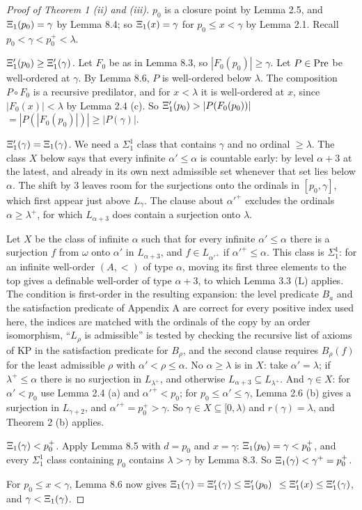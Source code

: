 \documentclass[11pt]{article}
\begin{document}
\begin{proof}[Proof of Theorem 1 (ii) and (iii)] $p_0$ is a closure point by Lemma 2.5, and $\Xi_1(p_0) = \gamma$
by Lemma 8.4; so $\Xi_1(x) = \gamma$ for $p_0 \le x < \gamma$ by Lemma 2.1. Recall $p_0 < \gamma < p_0^+ < \lambda$.

\emph{$\Xi'_1(p_0) \ge \Xi'_1(\gamma)$.} Let $F_0$ be as in Lemma 8.3, so $|F_0(p_0)| \ge \gamma$. Let $P \in \mathrm{Pre}$ be
well-ordered at $\gamma$. By Lemma 8.6, $P$ is well-ordered below $\lambda$. The composition $P \circ F_0$ is a recursive
predilator, and for $x < \lambda$ it is well-ordered at $x$, since $|F_0(x)| < \lambda$ by Lemma 2.4 (c). So
$\Xi'_1(p_0) > |P(F_0(p_0))|$ ${}= |P(|F_0(p_0)|)| \ge |P(\gamma)|$.

\emph{$\Xi'_1(\gamma) = \Xi_1(\gamma)$.} We need a $\Sigma^1_1$ class that contains $\gamma$ and no ordinal $\ge \lambda$. The
class $X$ below says that every infinite $\alpha' \le \alpha$ is countable early: by level $\alpha + 3$ at the
latest, and already in its own next admissible set whenever that set lies below $\alpha$. The shift by $3$ leaves
room for the surjections onto the ordinals in $[p_0, \gamma]$, which first appear just above $L_{\gamma}$. The
clause about $\alpha'^+$ excludes the ordinals $\alpha \ge \lambda^+$, for which $L_{\alpha+3}$ does contain a surjection
onto $\lambda$.

Let $X$ be the class of infinite $\alpha$ such that for every infinite
$\alpha' \le \alpha$ there is a surjection $f$ from $\omega$ onto $\alpha'$ in $L_{\alpha + 3}$, and
$f \in L_{\alpha'^+}$ if $\alpha'^+ \le \alpha$. This class is $\Sigma^1_1$: for an infinite well-order $(A, <)$ of
type $\alpha$, moving its first three elements to the top gives a definable well-order of type $\alpha + 3$, to which
Lemma 3.3 (L) applies. The condition is first-order in the resulting expansion: the level predicate $B_a$ and the
satisfaction predicate of Appendix A are correct for every positive index used here, the indices are matched with the ordinals
of the copy by an order isomorphism, ``$L_{\rho}$ is admissible'' is tested by checking the recursive list of axioms
of KP in the satisfaction predicate for $B_\rho$, and the second clause requires $B_\rho(f)$ for the least admissible
$\rho$ with $\alpha' < \rho \le \alpha$. No $\alpha \ge \lambda$
is in $X$: take $\alpha' = \lambda$; if $\lambda^+ \le \alpha$ there is no surjection in $L_{\lambda^+}$, and otherwise
$L_{\alpha+3} \subseteq L_{\lambda^+}$. And $\gamma \in X$: for $\alpha' < p_0$ use Lemma 2.4 (a) and
$\alpha'^+ < p_0$; for $p_0 \le \alpha' \le \gamma$, Lemma 2.6 (b) gives a surjection in $L_{\gamma+2}$, and
$\alpha'^+ = p_0^+ > \gamma$. So $\gamma \in X \subseteq [0, \lambda)$ and $r(\gamma) = \lambda$, and Theorem 2 (b) applies.

\emph{$\Xi_1(\gamma) < p_0^+$.} Apply Lemma 8.5 with $d = p_0$ and $x = \gamma$: $\Xi_1(p_0) = \gamma < p_0^+$,
and every $\Sigma^1_1$ class containing $p_0$ contains $\lambda > \gamma$ by Lemma 8.3. So
$\Xi_1(\gamma) < \gamma^+ = p_0^+$.

For $p_0 \le x < \gamma$, Lemma 8.6 now gives
$\Xi_1(\gamma) = \Xi'_1(\gamma) \le \Xi'_1(p_0)$ ${}\le \Xi'_1(x) \le \Xi'_1(\gamma)$, and $\gamma < \Xi_1(\gamma)$.
\end{proof}
\end{document}
